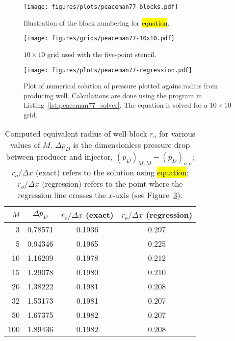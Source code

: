\begin{figure}[htbp]
    \centering
    \texttt{[image: figures/plots/peaceman77-blocks.pdf]}
    \caption{Illustration of the block numbering for \hl{equation}.}
    \label{fig:label}
\end{figure}

\begin{figure}[htbp]
    \centering
    \texttt{[image: figures/grids/peaceman77-10x10.pdf]}
    \caption{$10\times 10$ grid used with the five-point stencil.}
    \label{fig:label}
\end{figure}

\begin{figure}[htbp]
    \centering
    \texttt{[image: figures/plots/peaceman77-regression.pdf]}
    \caption{Plot of numerical solution of pressure plotted agains radius from producing well. Calculations are done using the program in Listing~\ref{lst:peaceman77_solver}. The equation is solved for a $10\times 10$ grid.}
    \label{fig:peaceman77_pressure_vs_radius}
\end{figure}

\begin{table}
    \centering
    \caption{Computed equivalent radius of well-block $r_o$ for various values of $M$. $\Delta p_D$ is the dimensionless pressure drop between producer and injector, $(p_D)_{M,M} - (p_D)_{o,o}$; $r_o/\Delta x$ (exact) refers to the solution using \hl{equation}; $r_o / \Delta x$ (regression) refers to the point where the regression line crosses the $x$-axis (see Figure~\ref{fig:peaceman77_pressure_vs_radius}).}
    \begin{tabular}{rccc}
        \toprule
        $M$ & $\Delta p_D$ & $r_o/\Delta x$ (exact) & $r_o / \Delta x$ (regression)\\
        \midrule
        3   & 0.78571 & 0.1936 & 0.297 \\
        5   & 0.94346 & 0.1965 & 0.225 \\
        10  & 1.16209 & 0.1978 & 0.212 \\
        15  & 1.29078 & 0.1980 & 0.210 \\
        20  & 1.38222 & 0.1981 & 0.208 \\
        32  & 1.53173 & 0.1981 & 0.207 \\
        50  & 1.67375 & 0.1982 & 0.207 \\
        100 & 1.89436 & 0.1982 & 0.208 \\
        \bottomrule
    \end{tabular}
    \label{tbl:label}
\end{table}

